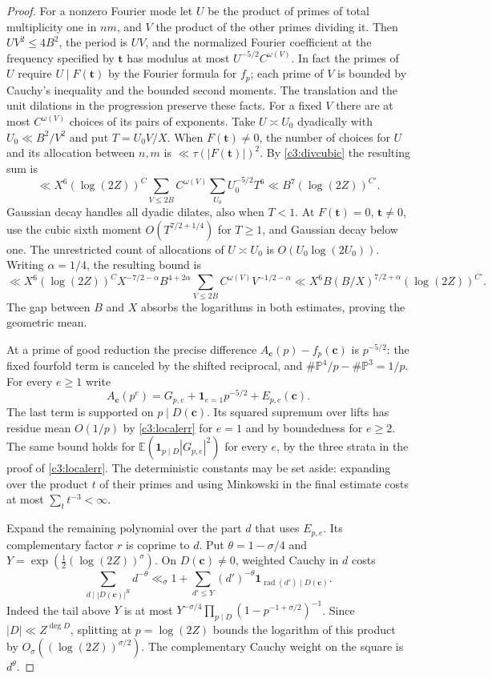 \documentclass[11pt,letterpaper]{article}
\theoremstyle{definition}
\begin{document}
\begin{proof}
For a nonzero Fourier mode let $U$ be the product of primes of
total multiplicity one in $nm$, and $V$ the product of the other
primes dividing it. Then $UV^2\le4B^2$, the period is $UV$, and
the normalized Fourier coefficient at the frequency specified
by $\mathbf t$ has modulus at most $U^{-5/2}C^{\omega(V)}$.
In fact the primes of $U$ require $U\mid F(\mathbf t)$ by the
Fourier formula for $f_p$; each prime of $V$ is bounded by
Cauchy's inequality and the bounded second moments. The translation
and the unit dilations in the progression preserve these facts.
For a fixed $V$ there are at most $C^{\omega(V)}$ choices of its
pairs of exponents. Take $U\asymp U_0$ dyadically with
$U_0\ll B^2/V^2$ and put $T=U_0 V/X$.
When $F(\mathbf t)\ne0$, the number of choices for $U$ and its
allocation between $n,m$ is $\ll\tau(|F(\mathbf t)|)^2$.
By \eqref{c3:divcubic} the resulting sum is
\[
 \ll X^6(\log(2Z))^C\sum_{V\le2B} C^{\omega(V)}
         \sum_{U_0} U_0^{-5/2} T^6
 \ll B^7(\log(2Z))^{C'} .
\]
Gaussian decay handles all dyadic dilates, also when $T<1$.
At $F(\mathbf t)=0$, $\mathbf t\ne0$, use the cubic sixth
moment $O(T^{7/2+1/4})$ for $T\ge1$, and Gaussian decay below
one. The unrestricted count of allocations of $U\asymp U_0$
is $O(U_0\log(2U_0))$. Writing $\alpha=1/4$, the resulting bound
is
\[
 \ll X^6(\log(2Z))^C X^{-7/2-\alpha} B^{4+2\alpha}
   \sum_{V\le2B} C^{\omega(V)}V^{-1/2-\alpha}
 \ll X^6B(B/X)^{7/2+\alpha}(\log(2Z))^{C'} .
\]
The gap between $B$ and $X$ absorbs the logarithms in both
estimates, proving the geometric mean.

At a prime of good reduction the precise difference
$A_{\mathbf c}(p)-f_p(\mathbf c)$ is $p^{-5/2}$:
the fixed fourfold term is canceled by the shifted reciprocal,
and $\#\mathbb P^4/p-\#\mathbb P^3=1/p$. For every $e\ge1$
write
\[
 A_{\mathbf c}(p^e)=G_{p,e}+\mathbf1_{e=1}p^{-5/2}
                      +E_{p,e}(\mathbf c).
\]
The last term is supported on $p\mid D(\mathbf c)$.
Its squared supremum over lifts has residue mean $O(1/p)$
by \eqref{c3:localerr} for $e=1$ and by boundedness for $e\ge2$.
The same bound holds for
$\mathbb E(\mathbf1_{p\mid D}|G_{p,e}|^2)$ for every $e$,
by the three strata in the proof of \eqref{c3:localerr}.
The deterministic constants may be set aside: expanding over
the product $t$ of their primes and using Minkowski in the final
estimate costs at most $\sum_t t^{-3}<\infty$.

Expand the remaining polynomial over the part $d$ that uses
$E_{p,e}$. Its complementary factor $r$ is coprime to $d$.
Put $\theta=1-\sigma/4$ and
$Y=\exp(\tfrac12(\log(2Z))^\sigma)$. On $D(\mathbf c)\ne0$,
weighted Cauchy in $d$ costs
\[
  \sum_{d\mid |D(\mathbf c)|^R} d^{-\theta}
  \ll_\sigma 1+
  \sum_{d'\le Y}(d')^{-\theta}
           \mathbf1_{\operatorname{rad}(d')\mid D(\mathbf c)} .
\]
Indeed the tail above $Y$ is at most
$Y^{-\sigma/4}\prod_{p\mid D}(1-p^{-1+\sigma/2})^{-1}$.
Since $|D|\ll Z^{\deg D}$, splitting at $p=\log(2Z)$ bounds
the logarithm of this product by $O_\sigma((\log(2Z))^{\sigma/2})$.
The complementary Cauchy weight on the square is $d^\theta$.


\end{proof}
\end{document}
